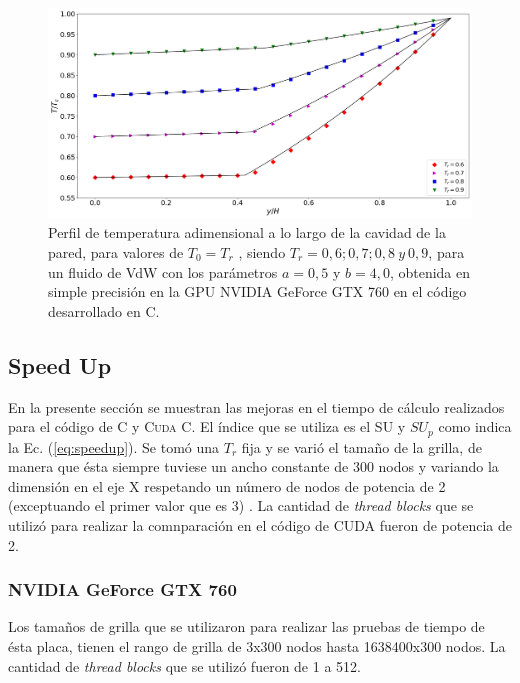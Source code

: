 \begin{figure}[h!]
	\centering
	\includegraphics[width=\textwidth]{figs/cap4/v_760_VdW_c_simple_T_y}
	\caption{Perfil de temperatura adimensional a lo largo de la cavidad de la pared, para valores de $T_0 = T_r$ , siendo $T_r = 0,6 ; 0,7 ; 0,8 \>y\> 0,9$, para un fluido de VdW con los parámetros $a = 0,5 $ y $b = 4,0 $, obtenida en simple precisión en la GPU NVIDIA GeForce GTX 760 en el código desarrollado en \textsc{C}.}
	\label{fig:v_760_VdW_c_simple_T_y}	
\end{figure}

\newpage

\subsection{Speed Up}

En la presente sección se muestran las mejoras en el tiempo de cálculo realizados para el código de \textsc{C} y \textsc{Cuda C}. El índice que se utiliza es el SU y $SU_p$ como indica la Ec. (\ref{eq:speedup}). Se tomó una $T_r$ fija y se varió el tamaño de la grilla, de manera que ésta siempre tuviese un ancho constante de 300 nodos y variando la dimensión en el eje \textsc{X} respetando un número de nodos de potencia de 2 (exceptuando el primer valor que es 3) . La cantidad de \textit{thread blocks} que se utilizó para realizar la comnparación en el código de \textsc{CUDA} fueron de potencia de 2.

\subsubsection{NVIDIA GeForce GTX 760}

Los tamaños de grilla que se utilizaron para realizar las pruebas de tiempo de ésta placa, tienen el rango de grilla de 3x300 nodos hasta 1638400x300 nodos. La cantidad de \textit{thread blocks} que se utilizó fueron de 1 a 512.

